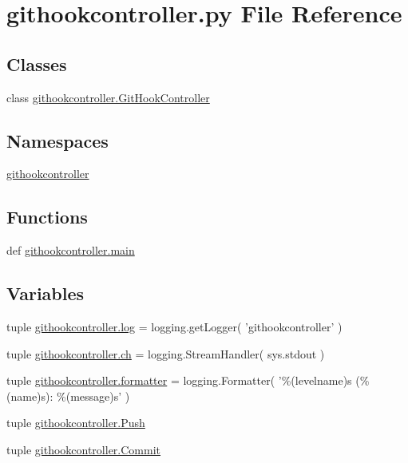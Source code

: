 \section{githookcontroller.\-py File Reference}
\label{githookcontroller_8py}
\subsection*{Classes}
\begin{DoxyCompactItemize}
\item 
class \hyperlink{classgithookcontroller_1_1GitHookController}{githookcontroller.\-Git\-Hook\-Controller}
\end{DoxyCompactItemize}
\subsection*{Namespaces}
\begin{DoxyCompactItemize}
\item 
\hyperlink{namespacegithookcontroller}{githookcontroller}
\end{DoxyCompactItemize}
\subsection*{Functions}
\begin{DoxyCompactItemize}
\item 
def \hyperlink{namespacegithookcontroller_a5c0a2facfdd7509f64df2aa6aefecf17}{githookcontroller.\-main}
\end{DoxyCompactItemize}
\subsection*{Variables}
\begin{DoxyCompactItemize}
\item 
tuple \hyperlink{namespacegithookcontroller_a3bbdf7a562461bd3baca4ef635d6dd50}{githookcontroller.\-log} = logging.\-get\-Logger( 'githookcontroller' )
\item 
tuple \hyperlink{namespacegithookcontroller_a13f0aa9843a2a5b05ba2e12f5ed3c903}{githookcontroller.\-ch} = logging.\-Stream\-Handler( sys.\-stdout )
\item 
tuple \hyperlink{namespacegithookcontroller_a8672f684f117c8c4733546a0bc9e9616}{githookcontroller.\-formatter} = logging.\-Formatter( '\%(levelname)s (\%(name)s)\-: \%(message)s' )
\item 
tuple \hyperlink{namespacegithookcontroller_ae617d8e0c886ed4e082bd11f1f33bd0d}{githookcontroller.\-Push}
\item 
tuple \hyperlink{namespacegithookcontroller_af0d83e4b5f26b63a7ee452f3eb566ef4}{githookcontroller.\-Commit}
\end{DoxyCompactItemize}
